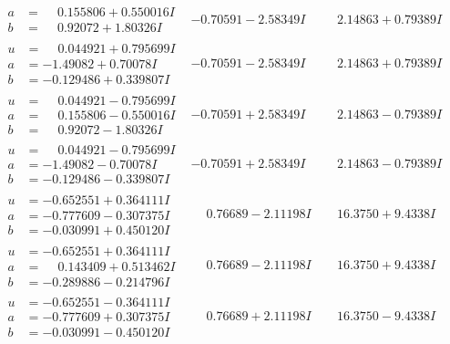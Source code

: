 \documentclass[1p]{elsarticle_modified}
\theoremstyle{definition}
\begin{document}
$$\begin{array}{c|c|c}
\begin{aligned}
a &= \phantom{-}0.155806 + 0.550016 I \\
b &= \phantom{-}0.92072 + 1.80326 I\end{aligned}
 & -0.70591 - 2.58349 I & \phantom{-}2.14863 + 0.79389 I \\ \hline\begin{aligned}
u &= \phantom{-}0.044921 + 0.795699 I \\
a &= -1.49082 + 0.70078 I \\
b &= -0.129486 + 0.339807 I\end{aligned}
 & -0.70591 - 2.58349 I & \phantom{-}2.14863 + 0.79389 I \\ \hline\begin{aligned}
u &= \phantom{-}0.044921 - 0.795699 I \\
a &= \phantom{-}0.155806 - 0.550016 I \\
b &= \phantom{-}0.92072 - 1.80326 I\end{aligned}
 & -0.70591 + 2.58349 I & \phantom{-}2.14863 - 0.79389 I \\ \hline\begin{aligned}
u &= \phantom{-}0.044921 - 0.795699 I \\
a &= -1.49082 - 0.70078 I \\
b &= -0.129486 - 0.339807 I\end{aligned}
 & -0.70591 + 2.58349 I & \phantom{-}2.14863 - 0.79389 I \\ \hline\begin{aligned}
u &= -0.652551 + 0.364111 I \\
a &= -0.777609 - 0.307375 I \\
b &= -0.030991 + 0.450120 I\end{aligned}
 & \phantom{-}0.76689 - 2.11198 I & \phantom{-}16.3750 + 9.4338 I \\ \hline\begin{aligned}
u &= -0.652551 + 0.364111 I \\
a &= \phantom{-}0.143409 + 0.513462 I \\
b &= -0.289886 - 0.214796 I\end{aligned}
 & \phantom{-}0.76689 - 2.11198 I & \phantom{-}16.3750 + 9.4338 I \\ \hline\begin{aligned}
u &= -0.652551 - 0.364111 I \\
a &= -0.777609 + 0.307375 I \\
b &= -0.030991 - 0.450120 I\end{aligned}
 & \phantom{-}0.76689 + 2.11198 I & \phantom{-}16.3750 - 9.4338 I \\ \hline\begin{aligned}

\end{aligned}
\end{array}$$
\end{document}
